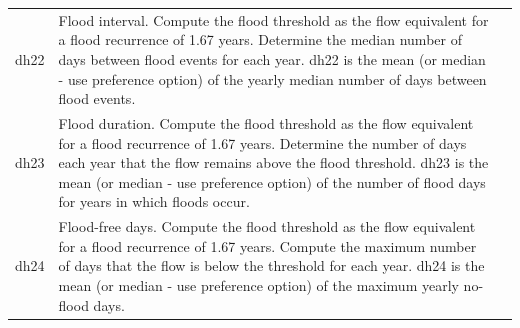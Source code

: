 \documentclass[a4paper,11pt]{article}\usepackage[]{graphicx}\usepackage[]{color}
\begin{document}
\begin{table}[ht]
\begin{threeparttable}[b]
\begin{tabularx}{\textwidth}{lXl}
  dh22 & Flood interval. Compute the flood threshold as the flow equivalent for a flood recurrence of 1.67 years. Determine the median number of days between flood events for each year. dh22 is the mean (or median - use preference option) of the yearly median number of days between flood events. \\
  dh23 & Flood duration. Compute the flood threshold as the flow equivalent for a flood recurrence of 1.67 years. Determine the number of days each year that the flow remains above the flood threshold. dh23 is the mean (or median - use preference option) of the number of flood days for years in which floods occur. \\
  dh24 & Flood-free days. Compute the flood threshold as the flow equivalent for a flood recurrence of 1.67 years. Compute the maximum number of days that the flow is below the threshold for each year. dh24 is the mean (or median - use preference option) of the maximum yearly no-flood days. \\
   \hline
\end{tabularx}
\end{threeparttable}
\end{table}
\end{document}
